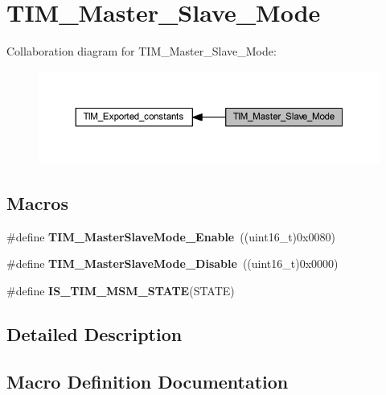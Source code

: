\hypertarget{group___t_i_m___master___slave___mode}{}\section{T\+I\+M\+\_\+\+Master\+\_\+\+Slave\+\_\+\+Mode}
\label{group___t_i_m___master___slave___mode}
Collaboration diagram for T\+I\+M\+\_\+\+Master\+\_\+\+Slave\+\_\+\+Mode\+:
\nopagebreak
\begin{figure}[H]
\begin{center}
\leavevmode
\includegraphics[width=350pt]{group___t_i_m___master___slave___mode}
\end{center}
\end{figure}
\subsection*{Macros}
\begin{DoxyCompactItemize}
\item 
\mbox{\label{group___t_i_m___master___slave___mode_gaef5da910ae6952fce424b440ea39f69a}} 
\#define {\bfseries T\+I\+M\+\_\+\+Master\+Slave\+Mode\+\_\+\+Enable}~((uint16\+\_\+t)0x0080)
\item 
\mbox{\label{group___t_i_m___master___slave___mode_ga8d4c7c0f57469f384b1327bb323d28a3}} 
\#define {\bfseries T\+I\+M\+\_\+\+Master\+Slave\+Mode\+\_\+\+Disable}~((uint16\+\_\+t)0x0000)
\item 
\#define {\bfseries I\+S\+\_\+\+T\+I\+M\+\_\+\+M\+S\+M\+\_\+\+S\+T\+A\+TE}(S\+T\+A\+TE)
\end{DoxyCompactItemize}


\subsection{Detailed Description}


\subsection{Macro Definition Documentation}
\mbox{\label{group___t_i_m___master___slave___mode_ga53146701cf287a0eca43b9232dffac60}} 
